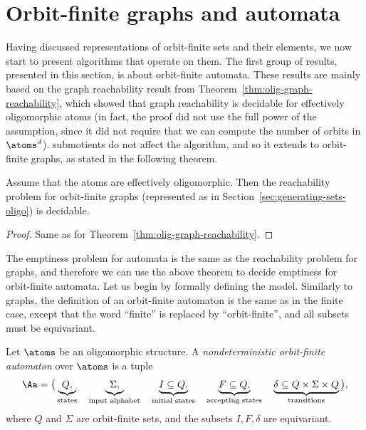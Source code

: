 
	\section{Orbit-finite graphs and automata}
	\label{sec:orbit-finite-automata} 
Having discussed representations of orbit-finite sets and their elements, we now start to present algorithms that operate on them. The first group of results, presented in this section, is about orbit-finite automata. These results are  mainly based on the graph reachability result from  Theorem~\ref{thm:olig-graph-reachability}, which showed that graph reachability is decidable for effectively oligomorphic atoms (in fact, the proof did not use the full power of the assumption, since it did not require that we can compute the number of orbits in $\atoms^d$).  submotients do not affect the algorithm, and so it extends to orbit-finite graphs, as stated in the following theorem.  

	\begin{theorem}\label{thm:oligo-spof-graph-reachability}
		Assume that the atoms are effectively oligomorphic.
		Then the reachability problem for orbit-finite graphs (represented as in Section~\ref{sec:generating-sets-oligo}) is decidable. 
		\end{theorem}
		\begin{proof}
			Same as  for Theorem~\ref{thm:olig-graph-reachability}.
		\end{proof}

The emptiness problem for automata is the same as the reachability problem for graphs, and therefore we can use the above theorem to decide emptiness for orbit-finite automata. Let us begin by formally defining the model.
Similarly to graphs, the definition of an orbit-finite automaton is the same as in the finite case, except that the word ``finite'' is replaced by ``orbit-finite'', and all subsets must be equivariant.
 
\begin{definition}\label{def:orbit-finite-automata}
	Let $\atoms$ be an oligomorphic structure. 
	A \emph{nondeterministic orbit-finite automaton} over $\atoms$ is a tuple
	\begin{align*}
 \Aa = \big(\underbrace{Q,}_{\text{states}} \quad \underbrace{\Sigma,}_{\text{input alphabet}} \quad \underbrace{I \subseteq Q,}_{\text{initial states}} \quad \underbrace{F \subseteq Q,}_{\text{accepting states}} \quad \underbrace{\delta \subseteq Q \times \Sigma \times Q}_{\text{transitions}} \big),
\end{align*}
where $Q$ and $\Sigma$  are orbit-finite sets, and the subsets $I, F, \delta$ are equivariant.
\end{definition}

